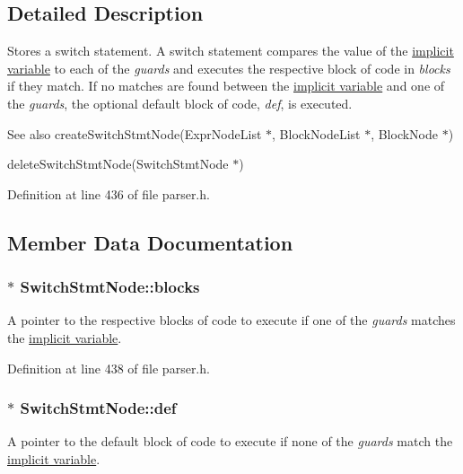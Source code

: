 \subsection{Detailed Description}
Stores a switch statement. A switch statement compares the value of the \hyperlink{impvar}{implicit variable} to each of the {\itshape guards\/} and executes the respective block of code in {\itshape blocks\/} if they match. If no matches are found between the \hyperlink{impvar}{implicit variable} and one of the {\itshape guards\/}, the optional default block of code, {\itshape def\/}, is executed.

\begin{DoxySeeAlso}{See also}
create\-Switch\-Stmt\-Node(\-Expr\-Node\-List $\ast$, Block\-Node\-List $\ast$, Block\-Node $\ast$) 

delete\-Switch\-Stmt\-Node(\-Switch\-Stmt\-Node $\ast$) 
\end{DoxySeeAlso}


Definition at line 436 of file parser.\-h.



\subsection{Member Data Documentation}
\hypertarget{struct_switch_stmt_node_a6cdb5c66044261b28302b6ca682d7564}{
\subsubsection[{blocks}]{$\ast$ {\bf Switch\-Stmt\-Node\-::blocks}}}\label{struct_switch_stmt_node_a6cdb5c66044261b28302b6ca682d7564}
A pointer to the respective blocks of code to execute if one of the {\itshape guards\/} matches the \hyperlink{impvar}{implicit variable}. 

Definition at line 438 of file parser.\-h.

\hypertarget{struct_switch_stmt_node_ad75de1632a46c451d251959e56d53d44}{
\subsubsection[{def}]{$\ast$ {\bf Switch\-Stmt\-Node\-::def}}}\label{struct_switch_stmt_node_ad75de1632a46c451d251959e56d53d44}
A pointer to the default block of code to execute if none of the {\itshape guards\/} match the \hyperlink{impvar}{implicit variable}. 

